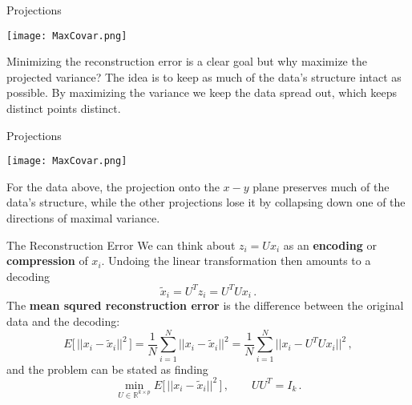 \documentclass[10pt, table, dvipsnames,xcdraw,handout]{beamer}
\newcommand{\bR}{\ensuremath{\mathbb{R}}}
\begin{document}
\begin{frame}[fragile]{Projections}
  \begin{minipage}[t][0.5\textheight][t]{\textwidth}
	\centering \texttt{[image: MaxCovar.png]} 
  \end{minipage}
  \vfill
\begin{minipage}[t][0.5\textheight][t]{\textwidth}
Minimizing the reconstruction error is a clear goal but why maximize the projected variance? The idea is to keep as much of the data's structure intact as possible. By maximizing the variance we keep the data spread out, which keeps distinct points distinct. 
\end{minipage}
\end{frame}



\begin{frame}[fragile]{Projections}
  \begin{minipage}[t][0.5\textheight][t]{\textwidth}
	\centering \texttt{[image: MaxCovar.png]} 
  \end{minipage}
  \vfill
\begin{minipage}[t][0.5\textheight][t]{\textwidth}
For the data above, the projection onto the $x-y$ plane preserves much of the data's structure, while the other projections lose it by collapsing down one of the directions of maximal variance. 
\end{minipage}
\end{frame}




\begin{frame}[fragile]{The Reconstruction Error}
We can think about $z_i = Ux_i$ as an \textbf{encoding} or \textbf{compression} of $x_i$. Undoing the linear transformation then amounts to a decoding 
$$
\widetilde{x}_i = U^Tz_i = U^TUx_i\,.
$$\pause
The \textbf{mean squred reconstruction error} is the difference between the original data and the decoding:
$$
E\big[\,||x_i - \widetilde{x}_i||^2\,\big] = \frac{1}{N}\sum_{i=1}^N ||x_i - \widetilde{x}_i||^2 = \frac{1}{N}\sum_{i=1}^N ||x_i - U^TUx_i||^2\,,
$$\pause
and the problem can be stated as finding 
$$
\min_{U\in \bR^{k\times p} } E\big[\,||x_i - \widetilde{x}_i||^2\,\big]  \,,\hspace{2em} UU^T = I_k\,.
$$
\end{frame}
\end{document}
